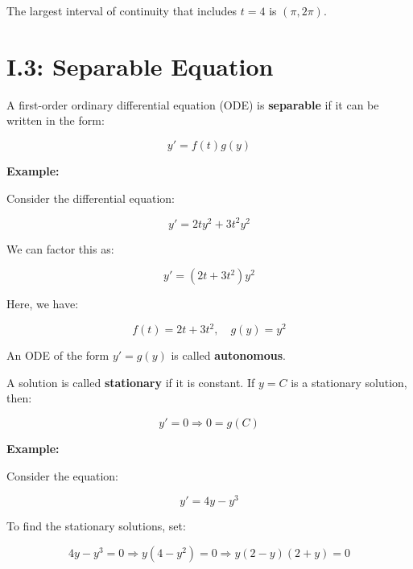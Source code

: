 \documentclass{article}
\begin{document}
The largest interval of continuity that includes \( t = 4 \) is \( (\pi, 2\pi) \).


\begin{center}
\end{center}


\section*{I.3: Separable Equation}

A first-order ordinary differential equation (ODE) is \textbf{separable} if it can be written in the form:

\[
y' = f(t)g(y)
\]

\textbf{Example:}

Consider the differential equation:

\[
y' = 2ty^2 + 3t^2y^2
\]

We can factor this as:

\[
y' = (2t + 3t^2)y^2
\]

Here, we have:

\[
f(t) = 2t + 3t^2, \quad g(y) = y^2
\]

An ODE of the form \( y' = g(y) \) is called \textbf{autonomous}.

A solution is called \textbf{stationary} if it is constant. If \( y = C \) is a stationary solution, then:

\[
y' = 0 \Rightarrow \boxed{0 = g(C)}
\]

\textbf{Example:}

Consider the equation:

\[
y' = 4y - y^3
\]

To find the stationary solutions, set:

\[
4y - y^3 = 0 \Rightarrow y(4 - y^2) = 0 \Rightarrow y(2 - y)(2 + y) = 0
\]
\end{document}
